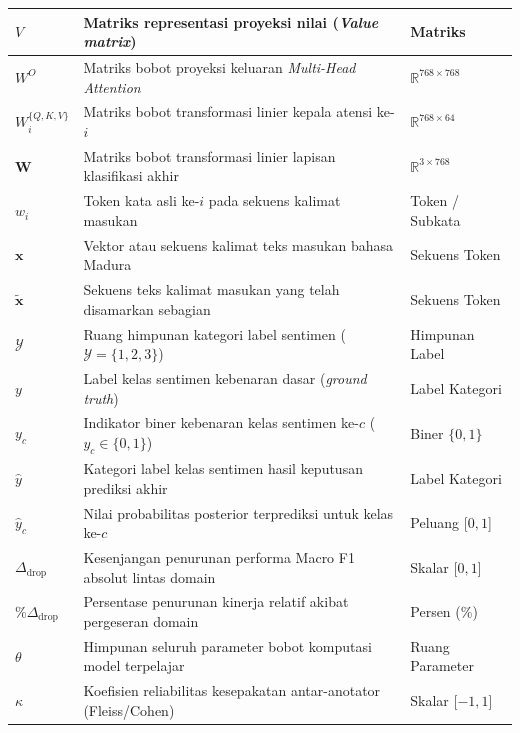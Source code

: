 \begin{longtable}{|>{\centering\arraybackslash}p{2.4cm}|>{\raggedright\arraybackslash}p{8.0cm}|>{\centering\arraybackslash}p{2.6cm}|}
    \hline
    $V$ & Matriks representasi proyeksi nilai (\textit{Value matrix}) & Matriks \\
    \hline
    $W^O$ & Matriks bobot proyeksi keluaran \textit{Multi-Head Attention} & $\mathbb{R}^{768 \times 768}$ \\
    \hline
    $W_i^{\{Q, K, V\}}$ & Matriks bobot transformasi linier kepala atensi ke-$i$ & $\mathbb{R}^{768 \times 64}$ \\
    \hline
    $\mathbf{W}$ & Matriks bobot transformasi linier lapisan klasifikasi akhir & $\mathbb{R}^{3 \times 768}$ \\
    \hline
    $w_i$ & Token kata asli ke-$i$ pada sekuens kalimat masukan & Token / Subkata \\
    \hline
    $\mathbf{x}$ & Vektor atau sekuens kalimat teks masukan bahasa Madura & Sekuens Token \\
    \hline
    $\tilde{\mathbf{x}}$ & Sekuens teks kalimat masukan yang telah disamarkan sebagian & Sekuens Token \\
    \hline
    $\mathcal{Y}$ & Ruang himpunan kategori label sentimen ($\mathcal{Y} = \{1, 2, 3\}$) & Himpunan Label \\
    \hline
    $y$ & Label kelas sentimen kebenaran dasar (\textit{ground truth}) & Label Kategori \\
    \hline
    $y_c$ & Indikator biner kebenaran kelas sentimen ke-$c$ ($y_c \in \{0, 1\}$) & Biner $\{0, 1\}$ \\
    \hline
    $\hat{y}$ & Kategori label kelas sentimen hasil keputusan prediksi akhir & Label Kategori \\
    \hline
    $\hat{y}_c$ & Nilai probabilitas posterior terprediksi untuk kelas ke-$c$ & Peluang [$0, 1$] \\
    \hline
    $\Delta_{\text{drop}}$ & Kesenjangan penurunan performa Macro F1 absolut lintas domain & Skalar [$0, 1$] \\
    \hline
    $\%\Delta_{\text{drop}}$ & Persentase penurunan kinerja relatif akibat pergeseran domain & Persen (\%) \\
    \hline
    $\theta$ & Himpunan seluruh parameter bobot komputasi model terpelajar & Ruang Parameter \\
    \hline
    $\kappa$ & Koefisien reliabilitas kesepakatan antar-anotator (Fleiss/Cohen) & Skalar [$-1, 1$] \\
    \hline
\end{longtable}
